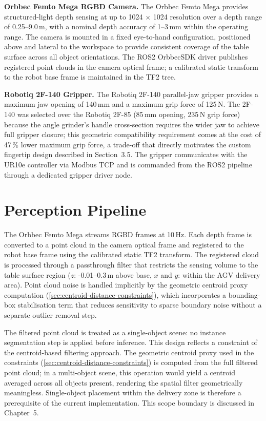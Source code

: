\documentclass[12pt, a4paper]{report}
\begin{document}
\textbf{Orbbec Femto Mega RGBD Camera.} The Orbbec Femto Mega provides structured-light depth sensing at up to 1024 $\times$ 1024 resolution over a depth range of 0.25--9.0\,m, with a nominal depth accuracy of 1--3\,mm within the operating range. The camera is mounted in a fixed eye-to-hand configuration, positioned above and lateral to the workspace to provide consistent coverage of the table surface across all object orientations. The ROS2 OrbbecSDK driver publishes registered point clouds in the camera optical frame; a calibrated static transform to the robot base frame is maintained in the TF2 tree.

\textbf{Robotiq 2F-140 Gripper.} The Robotiq 2F-140 parallel-jaw gripper provides a maximum jaw opening of 140\,mm and a maximum grip force of 125\,N. The 2F-140 was selected over the Robotiq 2F-85 (85\,mm opening, 235\,N grip force) because the angle grinder's handle cross-section requires the wider jaw to achieve full gripper closure; this geometric compatibility requirement comes at the cost of 47\,\% lower maximum grip force, a trade-off that directly motivates the custom fingertip design described in Section~3.5. The gripper communicates with the UR10e controller via Modbus TCP and is commanded from the ROS2 pipeline through a dedicated gripper driver node.

\section{Perception Pipeline}
\label{sec:perception-pipeline}
The Orbbec Femto Mega streams RGBD frames at 10\,Hz. Each depth frame is converted to a point cloud in the camera optical frame and registered to the robot base frame using the calibrated static TF2 transform. The registered cloud is processed through a passthrough filter that restricts the sensing volume to the table surface region ($z$: -0.01--0.3\,m above base, $x$ and $y$: within the AGV delivery area). Point cloud noise is handled implicitly by the geometric centroid proxy computation (\cref{sec:centroid-distance-constraints}), which incorporates a bounding-box stabilisation term that reduces sensitivity to sparse boundary noise without a separate outlier removal step.

The filtered point cloud is treated as a single-object scene: no instance segmentation step is applied before inference. This design reflects a constraint of the centroid-based filtering approach. The geometric centroid proxy used in the constraints (\cref{sec:centroid-distance-constraints}) is computed from the full filtered point cloud; in a multi-object scene, this operation would yield a centroid averaged across all objects present, rendering the spatial filter geometrically meaningless. Single-object placement within the delivery zone is therefore a prerequisite of the current implementation. This scope boundary is discussed in Chapter~5.
\end{document}
